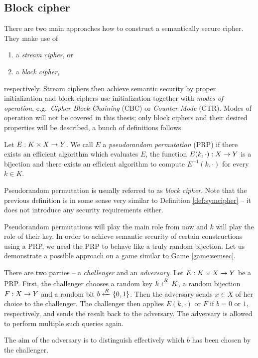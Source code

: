 
\subsection{Block cipher}

There are two main approaches how to construct a semantically secure cipher. They make use of
\begin{enumerate}
	\item a {\em stream cipher}, or
	\item a {\em block cipher},
\end{enumerate}
respectively. Stream ciphers then achieve semantic security by proper initialization and block ciphers use initialization together with {\em modes of operation}, e.g.\ {\em Cipher Block Chaining} (CBC) or {\em Counter Mode} (CTR). Modes of operation will not be covered in this thesis; only block ciphers and their desired properties will be described, a bunch of definitions follows.

\begin{defn}
\label{def:prp}
	Let $E: K\times X\rightarrow Y$. We call $E$ a {\em pseudorandom permutation} (PRP) if there exists an efficient algorithm which evaluates $E$, the function $E(k,\cdot): X\rightarrow Y$ is a bijection and there exists an efficient algorithm to compute $E^{-1}(k,\cdot)$ for every $k\in K$.
\end{defn}

\begin{note}
	Pseudorandom permutation is usually referred to as {\em block cipher}. Note that the previous definition is in some sense very similar to Definition \ref{def:symcipher} -- it does not introduce any security requirements either.
\end{note}

Pseudorandom permutations will play the main role from now and $k$ will play the role of their key. In order to achieve semantic security of certain constructions using a PRP, we need the PRP to behave like a truly random bijection. Let us demonstrate a possible approach on a game similar to Game \ref{game:semsec}.

\begin{game}
\label{game:prp}
	There are two parties -- a {\em challenger} and an {\em adversary}. Let $E:K\times X\rightarrow Y$ be a PRP. First, the challenger chooses a random key $k\xleftarrow{R} K$, a random bijection $F:X\rightarrow Y$ and a random bit $b\xleftarrow{R}\{0,1\}$. Then the adversary sends $x\in X$ of her choice to the challenger. The challenger then applies $E(k,\cdot)$ or $F$ if $b=0$ or $1$, respectively, and sends the result back to the adversary. The adversary is allowed to perform multiple such queries again.
	
	The aim of the adversary is to distinguish effectively which $b$ has been chosen by the challenger.
\end{game}

